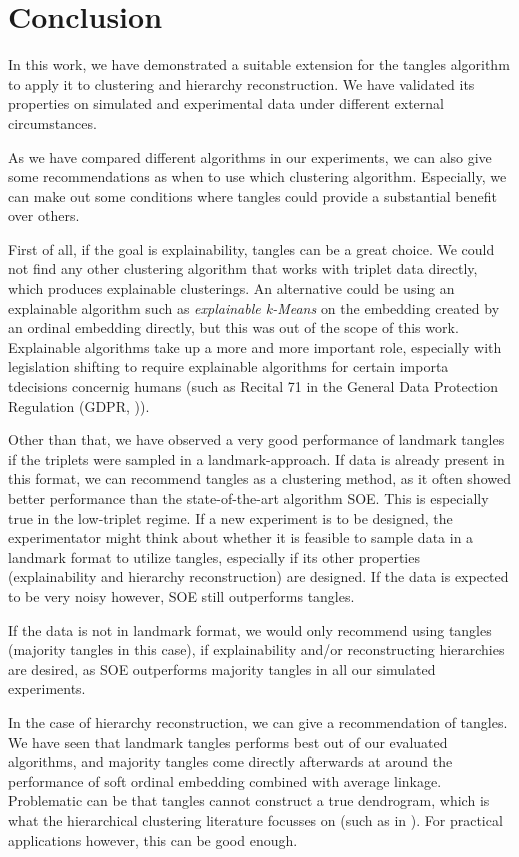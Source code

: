 \chapter{Conclusion}\label{conclusion}
In this work, we have demonstrated a suitable extension for the tangles algorithm to apply it to clustering and hierarchy reconstruction. 
We have validated its properties on simulated and experimental data under different external circumstances. 

As we have compared different algorithms in our experiments, we can also give some recommendations as when to use which clustering algorithm. Especially, we can make out
some conditions where tangles could provide a substantial benefit over others. 

First of all, if the goal is explainability, tangles can be a great choice. We could not find any other clustering algorithm that works with triplet data directly, which produces
explainable clusterings. An alternative could be using an explainable algorithm such as \textit{explainable k-Means} \citep{dasguptaExplainableMeansMedians2020} on the embedding created 
by an ordinal embedding directly, but this was out of the scope of this work. Explainable algorithms take up a more and more important role, especially with legislation shifting to 
require explainable algorithms for certain importa tdecisions concernig humans (such as Recital 71 in the General Data Protection Regulation (GDPR, )). %

Other than that, we have observed a very good performance of landmark tangles if the triplets were sampled in a landmark-approach. If data is already present in this format, we can recommend
tangles as a clustering method, as it often showed better performance than the state-of-the-art algorithm SOE. This is especially true in the low-triplet regime. 
If a new experiment is to be designed, the experimentator might think
about whether it is feasible to sample data in a landmark format to utilize tangles, especially if its other properties (explainability and hierarchy reconstruction) are designed. 
If the data is expected to be very noisy however, SOE still outperforms tangles. 

If the data is not in landmark format, we would only recommend using tangles (majority tangles in this case), if explainability and/or reconstructing hierarchies are desired, as SOE 
outperforms majority tangles in all our simulated experiments.

In the case of hierarchy reconstruction, we can give a recommendation of tangles. We have seen that landmark tangles performs best out of our evaluated algorithms, and majority tangles 
come directly afterwards at around the performance of soft ordinal embedding combined with average linkage. 
Problematic can be that tangles cannot construct a true dendrogram, which is what the hierarchical clustering literature focusses on (such as in \cite{ghoshdastidarFoundationsComparisonBasedHierarchical2019}). For practical applications however, this can be good enough. 

